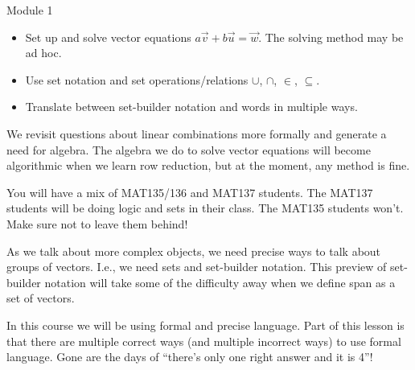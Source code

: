\documentclass{workbook}
\begin{document}
\begin{lesson}

	Module 1

	\begin{itemize}
		\item Set up and solve vector equations $a\vec v+b\vec u=\vec w$. The solving
			method may be ad hoc.
		\item Use set notation and set operations/relations $\cup$, $\cap$, $\in$, $\subseteq$.
		\item Translate between set-builder notation and words in multiple ways.
	\end{itemize}

	We revisit questions about linear combinations more formally and generate a need for
	algebra. The algebra we do to solve vector equations will become algorithmic when
	we learn row reduction, but at the moment, any method is fine.

	\begin{annotation}
		\begin{notes}
			You will have a mix of MAT135/136 and MAT137 students.
			The MAT137 students will be doing logic and sets in their
			class. The MAT135 students won't. Make sure not to leave them
			behind!
		\end{notes}
	\end{annotation}
	As we talk about more complex objects, we need precise ways to talk about
	groups of vectors. I.e., we need sets and set-builder notation. This preview of set-builder
	notation will take some of the difficulty away when we define span as a set of vectors.

	In this course we will be using formal and precise language. Part of this lesson
	is that there are multiple correct ways (and multiple incorrect ways) to use formal
	language. Gone are the days of ``there's only one right answer and it is 4''!

\end{lesson}
\end{document}
